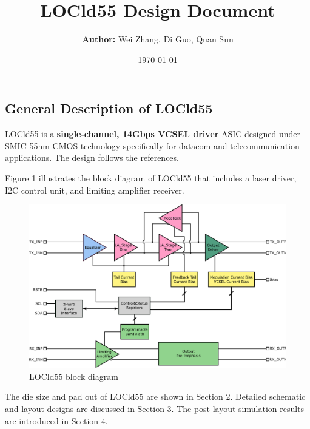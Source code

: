 \documentclass[15pt,a4paper]{article}
\title{\textbf{LOCld55 Design Document}}
\author{\textbf{Author:} Wei Zhang, Di Guo, Quan Sun}
\date{\today}
\begin{document}
\begin{spacing}{1.25}           %
\maketitle


\thispagestyle{empty}           %

\newpage

\tableofcontents                %

\thispagestyle{empty}           %

\newpage

\setcounter{page}{1}

\section{General Description of LOCld55}    %

LOCld55 is a \textbf{single-channel, 14Gbps VCSEL driver} ASIC designed under SMIC 55nm CMOS technology specifically for datacom and telecommunication applications. The design follows the references\cite{ref1}.

Figure 1 illustrates the block diagram of LOCld55 that includes a laser driver, I2C control unit, and limiting amplifier receiver.

\begin{figure}[H]
    \includegraphics[width=\linewidth]{./Img/locld55.png}
    \caption{LOCld55 block diagram}
\end{figure}

The die size and pad out of LOCld55 are shown in Section 2. Detailed schematic and layout designs are discussed in Section 3. The post-layout simulation results are introduced in Section 4.


\end{spacing}
\end{document}
